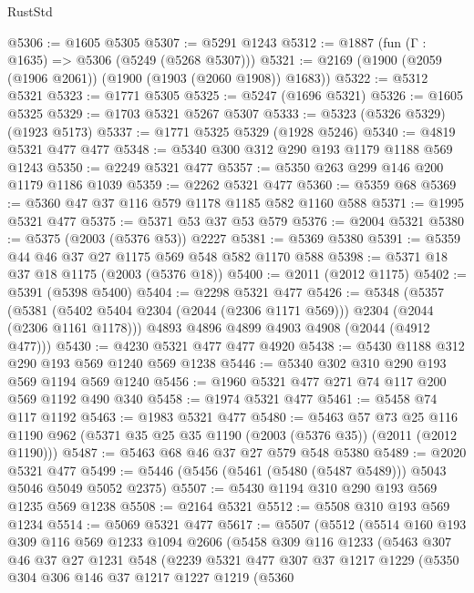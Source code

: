 \begin{lexlean}{RustStd}
\begin{coremodule}
{\begin{coremodule}
{{{{{{{{{{{{{{@5306 := @1605 @5305
@5307 := @5291 @1243
@5312 := @1887 (fun (Γ : @1635) => @5306 (@5249 (@5268 @5307)))
@5321 := @2169 (@1900 (@2059 (@1906 @2061)) (@1900 (@1903 (@2060 @1908)) @1683))
@5322 := @5312 @5321
@5323 := @1771 @5305
@5325 := @5247 (@1696 @5321)
@5326 := @1605 @5325
@5329 := @1703 @5321 @5267 @5307
@5333 := @5323 (@5326 @5329) (@1923 @5173)
@5337 := @1771 @5325 @5329 (@1928 @5246)
@5340 := @4819 @5321 @477 @477
@5348 := @5340 @300 @312 @290 @193 @1179 @1188 @569 @1243
@5350 := @2249 @5321 @477
@5357 := @5350 @263 @299 @146 @200 @1179 @1186 @1039
@5359 := @2262 @5321 @477
@5360 := @5359 @68
@5369 := @5360 @47 @37 @116 @579 @1178 @1185 @582 @1160 @588
@5371 := @1995 @5321 @477
@5375 := @5371 @53 @37 @53 @579
@5376 := @2004 @5321
@5380 := @5375 (@2003 (@5376 @53)) @2227
@5381 := @5369 @5380
@5391 := @5359 @44 @46 @37 @27 @1175 @569 @548 @582 @1170 @588
@5398 := @5371 @18 @37 @18 @1175 (@2003 (@5376 @18))
@5400 := @2011 (@2012 @1175)
@5402 := @5391 (@5398 @5400)
@5404 := @2298 @5321 @477
@5426 := @5348
    (@5357
      (@5381 (@5402 @5404 @2304 (@2044 (@2306 @1171 @569))) @2304 (@2044 (@2306 @1161 @1178)))
      @4893
      @4896
      @4899
      @4903
      @4908
      (@2044 (@4912 @477)))
@5430 := @4230 @5321 @477 @477 @4920
@5438 := @5430 @1188 @312 @290 @193 @569 @1240 @569 @1238
@5446 := @5340 @302 @310 @290 @193 @569 @1194 @569 @1240
@5456 := @1960 @5321 @477 @271 @74 @117 @200 @569 @1192 @490 @340
@5458 := @1974 @5321 @477
@5461 := @5458 @74 @117 @1192
@5463 := @1983 @5321 @477
@5480 := @5463
    @57
    @73
    @25
    @116
    @1190
    @962
    (@5371 @35 @25 @35 @1190 (@2003 (@5376 @35)) (@2011 (@2012 @1190)))
@5487 := @5463 @68 @46 @37 @27 @579 @548 @5380
@5489 := @2020 @5321 @477
@5499 := @5446 (@5456 (@5461 (@5480 (@5487 @5489))) @5043 @5046 @5049 @5052 @2375)
@5507 := @5430 @1194 @310 @290 @193 @569 @1235 @569 @1238
@5508 := @2164 @5321
@5512 := @5508 @310 @193 @569 @1234
@5514 := @5069 @5321 @477
@5617 := @5507
    (@5512
      (@5514
        @160
        @193
        @309
        @116
        @569
        @1233
        @1094
        @2606
        (@5458
          @309
          @116
          @1233
          (@5463
            @307
            @46
            @37
            @27
            @1231
            @548
            (@2239
              @5321
              @477
              @307
              @37
              @1217
              @1229
              (@5350
                @304
                @306
                @146
                @37
                @1217
                @1227
                @1219
                (@5360
}}}}}}}}}}}}}}
\end{coremodule}}
\end{coremodule}
\end{lexlean}
